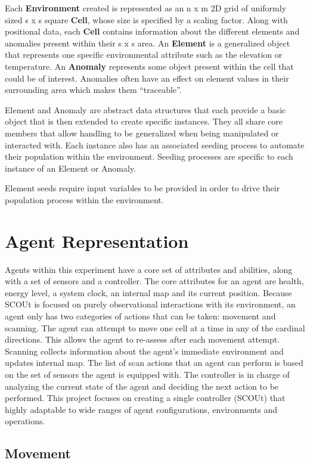 \documentclass[]{report}
\begin{document}
Each \textbf{Environment} created is represented as an n x m 2D grid of uniformly sized s x s square \textbf{Cell}, whose size is specified by a scaling factor.
Along with positional data, each \textbf{Cell} contains information about the different elements and anomalies present within their s x s area.
An \textbf{Element} is a generalized object that represents one specific environmental attribute such as the elevation or temperature.
An \textbf{Anomaly} represents some object present within the cell that could be of interest.
Anomalies often have an effect on element values in their surrounding area which makes them “traceable”.

Element and Anomaly are abstract data structures that each provide a basic object that is then extended to create specific instances.
They all share core members that allow handling to be generalized when being manipulated or interacted with.
Each instance also has an associated seeding process to automate their population within the environment.
Seeding processes are specific to each instance of an Element or Anomaly.

Element seeds require input variables to be provided in order to drive their population process within the environment.


\section{Agent Representation}
Agents within this experiment have a core set of attributes and abilities, along with a set of sensors and a controller.
The core attributes for an agent are health, energy level, a system clock, an internal map and its current position.
Because SCOUt is focused on purely observational interactions with its environment, an agent only has two categories of actions that can be taken: movement and scanning.
The agent can attempt to move one cell at a time in any of the cardinal directions.
This allows the agent to re-assess after each movement attempt.
Scanning collects information about the agent's immediate environment and updates internal map.
The list of scan actions that an agent can perform is based on the set of sensors the agent is equipped with.
The controller is in charge of analyzing the current state of the agent and deciding the next action to be performed.
This project focuses on creating a single controller (SCOUt) that highly adaptable to wide ranges of agent configurations, environments and operations.

\subsection{Movement}
\end{document}
